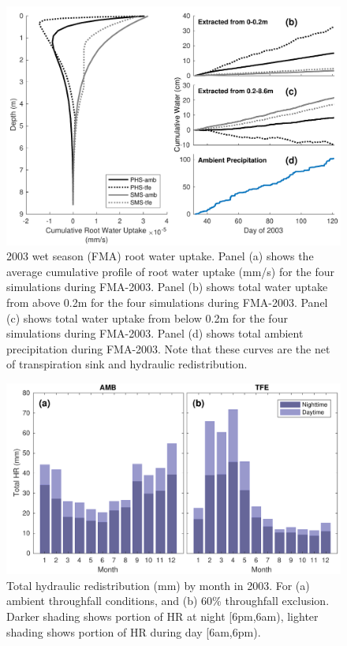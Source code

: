 \documentclass[draft,linenumbers]{agujournal}
\begin{document}
        \clearpage
    \begin{figure}[h]
     \centering
     \includegraphics[width=30pc]{../figs2/fig8.pdf}
     \caption{2003 wet season (FMA) root water uptake. 
     Panel (a) shows the average cumulative profile of root water uptake (mm/s) for the four simulations during FMA-2003.
     Panel (b) shows total water uptake from above 0.2m for the four simulations during FMA-2003.
     Panel (c) shows total water uptake from below 0.2m for the four simulations during FMA-2003. 
     Panel (d) shows total ambient precipitation during FMA-2003. 
     Note that these curves are the net of transpiration sink and hydraulic redistribution.
     }
     \label{fig8}
  \end{figure}
  
    \clearpage
    \begin{figure}[h]
     \centering
     \includegraphics[width=30pc]{../figs2/fig9.pdf}
     \caption{Total hydraulic redistribution (mm) by month in 2003. For (a) ambient throughfall conditions, and (b) 60\% throughfall exclusion. 
     Darker shading shows portion of HR at night [6pm,6am), lighter shading shows portion of HR during day [6am,6pm).}
     \label{fig9}
  \end{figure}
\end{document}
